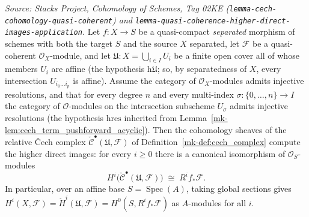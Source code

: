 \begin{lemma}\label{mk-lem:cech_computes_cohomology}
  \leanok

  \textit{Source: Stacks Project, Cohomology of Schemes, Tag 02KE
  (\texttt{lemma-cech-cohomology-quasi-coherent}) and
  \texttt{lemma-quasi-coherence-higher-direct-images-application}.}
  Let \(f : X \to S\) be a quasi-compact \emph{separated} morphism of schemes with
  both the target \(S\) and the source \(X\) separated, let \(\mathcal{F}\) be a
  quasi-coherent \(\mathcal{O}_X\)-module, and let
  \(\mathfrak{U} : X = \bigcup_{i \in I} U_i\) be a finite open cover all of whose
  members \(U_i\) are affine (the hypothesis \(\mathrm{h}\mathfrak{U}\); so, by
  separatedness of \(X\), every intersection \(U_{i_0 \ldots i_p}\) is affine).
  Assume the category of \(\mathcal{O}_X\)-modules admits injective resolutions, and
  that for every degree \(n\) and every multi-index \(\sigma : \{0, \ldots, n\} \to I\)
  the category of \(\mathcal{O}\)-modules on the intersection subscheme \(U_\sigma\)
  admits injective resolutions (the hypothesis \(\mathrm{hres}\) inherited from
  Lemma~\ref{mk-lem:cech_term_pushforward_acyclic}). Then the cohomology sheaves of the
  relative {\v C}ech complex \(\check{\mathcal{C}}^\bullet(\mathfrak{U}, \mathcal{F})\)
  of Definition~\ref{mk-def:cech_complex} compute the higher direct images: for every
  \(i \geq 0\) there is a canonical isomorphism of \(\mathcal{O}_S\)-modules
  \[
    H^i\bigl(\check{\mathcal{C}}^\bullet(\mathfrak{U}, \mathcal{F})\bigr)
      \;\cong\; R^i f_*\mathcal{F}.
  \]
  In particular, over an affine base \(S = \operatorname{Spec}(A)\), taking global
  sections gives \(H^i(X, \mathcal{F}) = \check{H}^i(\mathfrak{U}, \mathcal{F}) =
  H^0(S, R^i f_*\mathcal{F})\) as \(A\)-modules for all \(i\).


\end{lemma}
